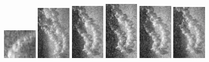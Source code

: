 \begin{figure}
    \includegraphics[width=0.15\textwidth]{chapters/images/dataset/all-class-images/chain/chain-204.jpg}
    \includegraphics[width=0.15\textwidth]{chapters/images/dataset/all-class-images/chain/chain-1.jpg}
    \includegraphics[width=0.15\textwidth]{chapters/images/dataset/all-class-images/chain/chain-11.jpg}
    \includegraphics[width=0.15\textwidth]{chapters/images/dataset/all-class-images/chain/chain-13.jpg}
    \includegraphics[width=0.15\textwidth]{chapters/images/dataset/all-class-images/chain/chain-12.jpg}
    \includegraphics[width=0.15\textwidth]{chapters/images/dataset/all-class-images/chain/chain-9.jpg}    

\end{figure}
